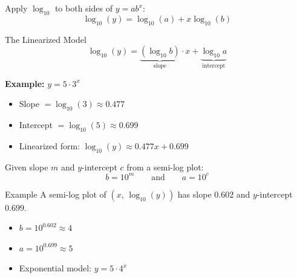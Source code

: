 \documentclass[aspectratio=169, 11pt]{beamer}
\begin{document}
\begin{frame}[t, plain]
  \vspace{0.2cm}
  Apply $\log_{10}$ to both sides of $y = ab^x$:
  \[
    \log_{10}(y) = \log_{10}(a) + x\log_{10}(b)
  \]
  \begin{block}{The Linearized Model}
    \[
      \log_{10}(y) = \underbrace{(\log_{10} b)}_{\text{slope}}\cdot x
                   + \underbrace{\log_{10} a}_{\text{intercept}}
    \]
  \end{block}
  \vspace{0.2cm}
  \textbf{Example:} $y = 5\cdot3^x$
  \begin{itemize}
    \setlength{\itemsep}{4pt}
    \item Slope $= \log_{10}(3) \approx 0.477$
    \item Intercept $= \log_{10}(5) \approx 0.699$
    \item Linearized form: $\log_{10}(y) \approx 0.477x + 0.699$
  \end{itemize}
\end{frame}

\begin{frame}[t, plain]
  \vspace{0.2cm}
  Given slope $m$ and $y$-intercept $c$ from a semi-log plot:
  \[
    b = 10^m \qquad \text{and} \qquad a = 10^c
  \]
  \begin{block}{Example}
    A semi-log plot of $(x,\,\log_{10}(y))$ has slope $0.602$ and $y$-intercept $0.699$.
    \begin{itemize}
      \setlength{\itemsep}{4pt}
      \item $b = 10^{0.602} \approx 4$
      \item $a = 10^{0.699} \approx 5$
      \item Exponential model: $y = 5\cdot4^x$
    \end{itemize}
  \end{block}
\end{frame}
\end{document}
